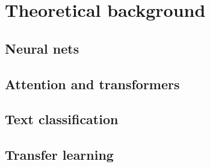 \chapter{Theoretical background}

\section{Neural nets}
\section{Attention and transformers}
\section{Text classification}
\section{Transfer learning}
